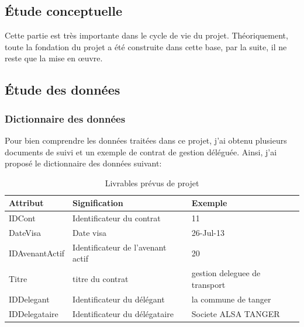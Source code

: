 \documentclass[a4paper]{report}
\begin{document}
\begin{doublespace}
	\chapter{Étude conceptuelle}
	\renewcommand{\headrulewidth}{1pt}
	\fancyhead[L]{\hspace*{5cm}}
	Cette partie est très importante dans le cycle de vie du projet. Théoriquement, toute la fondation du projet a été construite dans cette base, par la suite, il ne reste que la mise en œuvre.
	\section{Étude des données}
	\subsection{Dictionnaire des données}
	Pour bien comprendre les données traitées dans ce projet, j'ai obtenu plusieurs documents de suivi et un exemple de contrat de gestion déléguée. Ainsi, j'ai proposé le dictionnaire des données suivant:
	\begin{table}[H]
		\begin{center}
			\begin{tabularx}{17.5cm}{|X|X|X|}
				\hline
				\textbf{Attribut} & \textbf{Signification}            &
				\textbf{Exemple}                                                            \\
				\hline
				IDCont            & Identificateur du contrat         & 11                  \\
				\hline
				DateVisa          & Date visa                         & 26-Jul-13           \\
				\hline
				IDAvenantActif    & Identificateur de l'avenant actif &
				20                                                                          \\
				\hline
				Titre             & titre du contrat                  & gestion deleguee de
				transport                                                                   \\
				\hline
				IDDelegant        & Identificateur du délégant        & la commune de
				tanger                                                                      \\
				\hline
				IDDelegataire     & Identificateur du délégataire     & Societe ALSA
				TANGER                                                                      \\
				\hline
			\end{tabularx}
			\caption{Livrables prévus de projet}
		\end{center}
	\end{table}


\end{doublespace}
\end{document}
